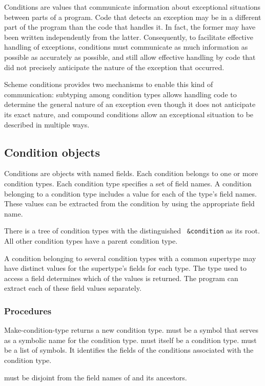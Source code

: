 Conditions are values that communicate information about exceptional
situations between parts of a program. Code that detects an exception
may be in a different part of the program than the code that handles
it. In fact, the former may have been written independently from the
latter. Consequently, to facilitate effective handling of exceptions,
conditions must communicate as much information as possible as
accurately as possible, and still allow effective handling by code
that did not precisely anticipate the nature of the exception that
occurred.

Scheme conditions provides two mechanisms to enable this kind of
communication: subtyping among condition types allows handling code to
determine the general nature of an exception even though it does not
anticipate its exact nature, and compound conditions allow an exceptional
situation to be described in multiple ways.

\subsection{Condition objects}

Conditions are objects with named fields. Each condition belongs to
one or more condition types. Each condition type specifies a set of
field names. A condition belonging to a condition type includes a
value for each of the type's field names. These values can be
extracted from the condition by using the appropriate field name.

There is a tree of condition types with the distinguished {\tt
  \&condition} as its root. All other condition types have a parent
condition type.

A condition belonging to several condition types with a common
supertype may have distinct values for the supertype's fields for each
type. The type used to access a field determines which of the values
is returned. The program can extract each of these field values
separately.  

\subsubsection{Procedures}

\begin{entry}{%
}

{\cf Make-condition-type} returns a new condition type.  must
be a symbol that serves as a symbolic name for the condition type.
 must itself be a condition type.  must
be a list of symbols. It identifies the fields of the conditions
associated with the condition type.

 must be disjoint from the field names of
 and its ancestors. 
\end{entry}


